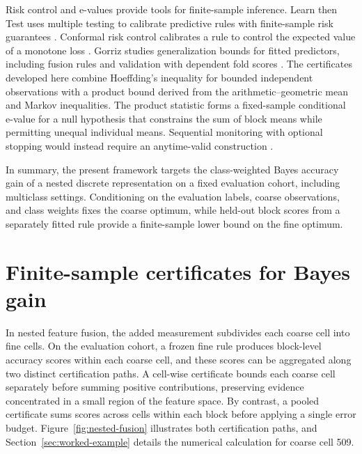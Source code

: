 \documentclass[preprint,11pt]{elsarticle}
\begin{document}
Risk control and e-values provide tools for finite-sample inference. Learn then Test uses multiple testing to calibrate predictive rules with finite-sample risk guarantees \cite{angelopoulos2025learntest}. Conformal risk control calibrates a rule to control the expected value of a monotone loss \cite{angelopoulos2024conformal}. Gorriz studies generalization bounds for fitted predictors, including fusion rules and validation with dependent fold scores \cite{gorriz2026evidence}. The certificates developed here combine Hoeffding's inequality for bounded independent observations \cite{hoeffding1963} with a product bound derived from the arithmetic--geometric mean and Markov inequalities. The product statistic forms a fixed-sample conditional e-value \cite{vovk2021evalues} for a null hypothesis that constrains the sum of block means while permitting unequal individual means. Sequential monitoring with optional stopping would instead require an anytime-valid construction \cite{ramdas2023savi}.

In summary, the present framework targets the class-weighted Bayes accuracy gain of a nested discrete representation on a fixed evaluation cohort, including multiclass settings. Conditioning on the evaluation labels, coarse observations, and class weights fixes the coarse optimum, while held-out block scores from a separately fitted rule provide a finite-sample lower bound on the fine optimum.

\section{Finite-sample certificates for Bayes gain}

In nested feature fusion, the added measurement subdivides each coarse cell into fine cells. On the evaluation cohort, a frozen fine rule produces block-level accuracy scores within each coarse cell, and these scores can be aggregated along two distinct certification paths. A cell-wise certificate bounds each coarse cell separately before summing positive contributions, preserving evidence concentrated in a small region of the feature space. By contrast, a pooled certificate sums scores across cells within each block before applying a single error budget. Figure~\ref{fig:nested-fusion} illustrates both certification paths, and Section~\ref{sec:worked-example} details the numerical calculation for coarse cell 509.
\end{document}
